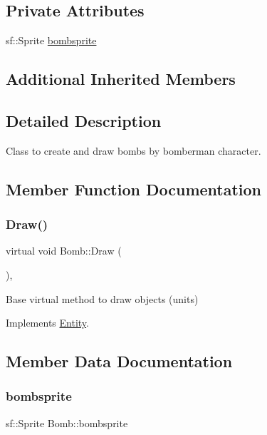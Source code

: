 \subsection*{Private Attributes}
\begin{DoxyCompactItemize}
\item 
sf\+::\+Sprite \mbox{\hyperlink{class_bomb_a9a227890e3f828b8dfd8bd3342a68dbd}{bombsprite}}
\end{DoxyCompactItemize}
\subsection*{Additional Inherited Members}


\subsection{Detailed Description}
Class to create and draw bombs by bomberman character. 

\subsection{Member Function Documentation}
\mbox{\label{class_bomb_a307a7d181cd802b6ae7fb41505fd841f}} 
\subsubsection{\texorpdfstring{Draw()}{Draw()}}
{\footnotesize\ttfamily virtual void Bomb\+::\+Draw (\begin{DoxyParamCaption}{ }\end{DoxyParamCaption})\hspace{0.3cm}{\ttfamily [override]}, {\ttfamily [virtual]}}

Base virtual method to draw objects (units) 

Implements \mbox{\hyperlink{class_entity_a1d006ae3028ba4ddfc9b4f202ccddf55}{Entity}}.



\subsection{Member Data Documentation}
\mbox{\label{class_bomb_a9a227890e3f828b8dfd8bd3342a68dbd}} 
\subsubsection{\texorpdfstring{bombsprite}{bombsprite}}
{\footnotesize\ttfamily sf\+::\+Sprite Bomb\+::bombsprite\hspace{0.3cm}{\ttfamily [private]}}

